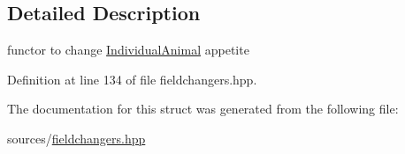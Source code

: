 \subsection{Detailed Description}
functor to change \hyperlink{classIndividualAnimal}{IndividualAnimal} appetite 

Definition at line 134 of file fieldchangers.hpp.



The documentation for this struct was generated from the following file:\begin{DoxyCompactItemize}
\item 
sources/\hyperlink{fieldchangers_8hpp}{fieldchangers.hpp}\end{DoxyCompactItemize}
